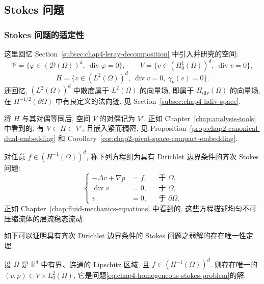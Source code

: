 \subsection{Stokes 问题}
\label{sec:chap4-stokes-problem}

\renewcommand{\thestatement}{5.\arabic{statement}}
\renewcommand{\theHstatement}{ch04.sec05.\arabic{statement}}
\setcounter{statement}{0}
\renewcommand{\thechapterfoursectionfiveremark}{5.\arabic{chapterfoursectionfiveremark}}

\subsubsection{Stokes 问题的适定性}
\label{subsec:chap4-stokes-wellposedness}

这里回忆 Section~\ref{subsec:chap4-leray-decomposition} 中引入并研究的空间:
\[
 \mathcal V=\{\varphi\in(\mathcal D(\Omega))^d,\ \operatorname{div}\varphi=0\},
 \qquad
 V=\{v\in(H_0^1(\Omega))^d,\ \operatorname{div}v=0\},
\]
\[
 H=\{v\in(L^2(\Omega))^d,\ \operatorname{div}v=0,\ \gamma_\nu(v)=0\}.
\]
还回忆, $(L^2(\Omega))^d$ 中散度属于 $L^2(\Omega)$ 的向量场, 即属于 $H_{\operatorname{div}}(\Omega)$ 的向量场, 在 $H^{-1/2}(\partial\Omega)$ 中有良定义的法向迹, 见 Section~\ref{subsec:chap4-hdiv-space}.

将 $H$ 与其对偶等同后, 空间 $V$ 的对偶记为 $V'$. 正如 Chapter~\ref{chap:analysis-tools} 中看到的, 有 $V\subset H\subset V'$, 且嵌入紧而稠密, 见 Proposition~\ref{prop:chap2-canonical-dual-embedding} 和 Corollary~\ref{cor:chap2-pivot-space-compact-embedding}.

对任意 $f\in(H^{-1}(\Omega))^d$, 称下列方程组为具有 Dirichlet 边界条件的齐次 Stokes 问题:
\begin{equation}
 \left\{
 \begin{aligned}
  -\Delta v+\nabla p&=f,&&\text{于 }\Omega,\\
  \operatorname{div}v&=0,&&\text{于 }\Omega,\\
  v&=0,&&\text{于 }\partial\Omega.
 \end{aligned}
 \right.
 \label{eq:chap4-homogeneous-stokes-problem}
\end{equation}
正如 Chapter~\ref{chap:fluid-mechanics-equations} 中看到的, 这些方程描述均匀不可压缩流体的层流稳态流动.

如下可以证明具有齐次 Dirichlet 边界条件的 Stokes 问题之弱解的存在唯一性定理.

\begin{Theorem}
\label{thm:chap4-stokes-homogeneous-wellposedness}
设 $\Omega$ 是 $\mathbb R^d$ 中有界、连通的 Lipschitz 区域, 且 $f\in(H^{-1}(\Omega))^d$. 则存在唯一的 $(v,p)\in V\times L_0^2(\Omega)$, 它是问题\eqref{eq:chap4-homogeneous-stokes-problem}的解.
\end{Theorem}

